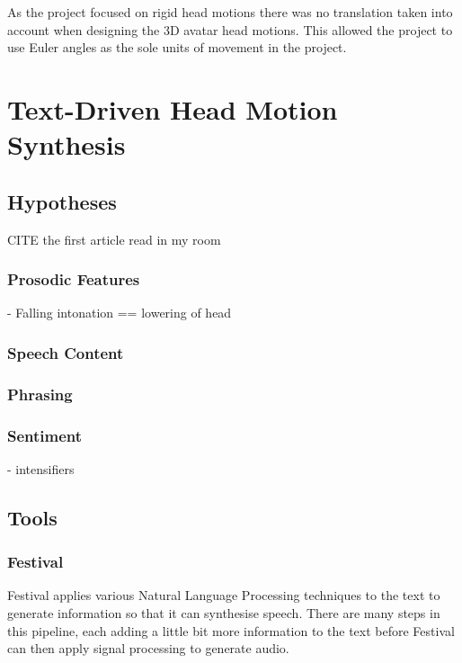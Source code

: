 \documentclass[bsc,frontabs,twoside,singlespacing,parskip]{infthesis}
\begin{document}
As the project focused on rigid head motions there was no translation taken into account when designing the 3D avatar head motions. This allowed the project to use Euler angles as the sole units of movement in the project.


\chapter{Text-Driven Head Motion Synthesis}

\section{Hypotheses}
 CITE the first article read in my room
\subsection{Prosodic Features}
- Falling intonation == lowering of head\\
\cite{kendon}

\subsection{Speech Content}
\subsection{Phrasing}
\subsection{Sentiment}
- intensifiers
\cite{emotion_head_motion}

\cite{kendon}

\section{Tools}

\subsection{Festival}

Festival applies various Natural Language Processing techniques to the text to generate information  so that it can synthesise speech.  There are many steps in this pipeline, each adding a little bit more information to the text before Festival can then apply signal processing to generate audio. 
\end{document}
